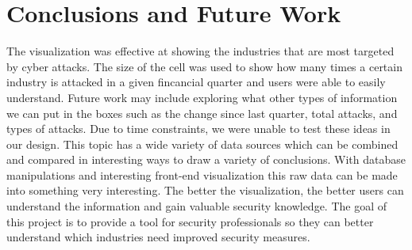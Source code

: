 \documentclass[journal]{vgtc}                %
\begin{document}
\section{Conclusions and Future Work}
The visualization was effective at showing the industries that are most targeted by cyber attacks. 
The size of the cell was used to show how many times a certain industry is attacked in a given fincancial quarter and users were able to easily understand.
Future work may include exploring what other types of information we can put in the boxes such as the change since last quarter, total attacks, and types of attacks. 
Due to time constraints, we were unable to test these ideas in our design.
This topic has a wide variety of data sources which can be combined and compared in interesting ways to draw a variety of conclusions.
With database manipulations and interesting front-end visualization this raw data can be made into something very interesting.
The better the visualization, the better users can understand the information and gain valuable security knowledge.
The goal of this project is to provide a tool for security professionals so they can better understand which industries need improved security measures. 

%

%
%
%


\end{document}
